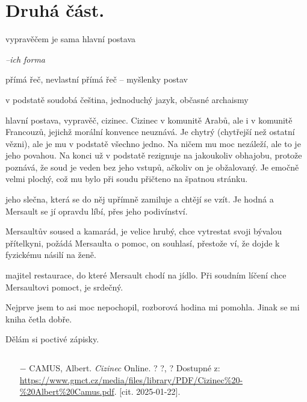 \documentclass{article}
\begin{document}
\section{Druhá část.}
\begin{description}
    \setlength\itemsep{0.15em}
    \item[vypravěč:] vypravěčem je sama hlavní postava
    \item[vyprávěcí způsoby:] \textit{--ich forma}
    \item[typy promluv:] přímá řeč, nevlastní přímá řeč -- myšlenky postav
    \item[jazyková stránka:] v podstatě soudobá čeština, jednoduchý jazyk, občasné archaismy
    \item[postavy:]
        \begin{description}
            \setlength\itemsep{0.15em}
           	\item[Mersault,] hlavní postava, vypravěč, cizinec. Cizinec v komunitě Arabů, ale i v komunitě Francouzů, jejichž morální konvence
                neuznává. Je chytrý (chytřejší než ostatní vězni), ale je mu v podstatě všechno jedno. Na ničem mu moc nezáleží, ale to je
                jeho povahou. Na konci už v podstatě rezignuje na jakoukoliv obhajobu, protože poznává, že soud je veden bez jeho vstupů,
                ačkoliv on je obžalovaný. Je emočně velmi plochý, což mu bylo při soudu přičteno na špatnou stránku.
            \item[Marie,] jeho slečna, která se do něj upřímně zamiluje a chtějí se vzít. Je hodná a Mersault se jí opravdu líbí, přes
                jeho podivínství.
            \item[Raymond,] Mersaultův soused a kamarád, je velice hrubý, chce vytrestat svoji bývalou přítelkyni, požádá Mersaulta o pomoc,
                on souhlasí, přestože ví, že dojde k fyzickému násilí na ženě.
            \item[Céleste,] majitel restaurace, do které Mersault chodí na jídlo. Při soudním líčení chce Mersaultovi pomoct, je srdečný.
        \end{description}
    \item[názor:] Nejprve jsem to asi moc nepochopil, rozborová hodina mi pomohla. Jinak se mi kniha četla dobře.
    \item[kontext:]  Dělám si poctivé zápisky.
    \item[zdroje:] $ $
    \begin{itemize}
        \setlength\itemsep{0em}
        \item[$-$] CAMUS, Albert. \textit{Cizinec} Online. ? ?, ? Dostupné z: \url{https://www.gmct.cz/media/files/library/PDF/Cizinec%20-%20Albert%20Camus.pdf}. [cit. 2025-01-22].
    \end{itemize}
\end{description}
\end{document}
